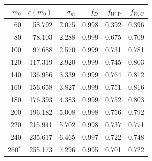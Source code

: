 \begin{tabular}{rrrrrr}
\toprule
$m_0$ & $c(m_0)$ & $\sigma_m$ & $f_D$ & $f_{W,\mathrm{P}}$ & $f_{W,\mathrm{C}}$ \\
\midrule
60 & 58.792 & 2.075 & 0.998 & 0.392 & 0.396 \\
80 & 78.103 & 2.288 & 0.999 & 0.675 & 0.709 \\
100 & 97.688 & 2.570 & 0.999 & 0.731 & 0.781 \\
120 & 117.319 & 2.920 & 0.999 & 0.745 & 0.803 \\
140 & 136.956 & 3.339 & 0.999 & 0.764 & 0.812 \\
160 & 156.658 & 3.827 & 0.999 & 0.751 & 0.816 \\
180 & 176.393 & 4.383 & 0.999 & 0.752 & 0.803 \\
200 & 196.182 & 5.008 & 0.998 & 0.756 & 0.792 \\
220 & 215.941 & 5.702 & 0.998 & 0.737 & 0.771 \\
240 & 235.617 & 6.465 & 0.997 & 0.722 & 0.748 \\
260$^{*}$ & 255.173 & 7.296 & 0.995 & 0.701 & 0.722 \\
\bottomrule
\end{tabular}
